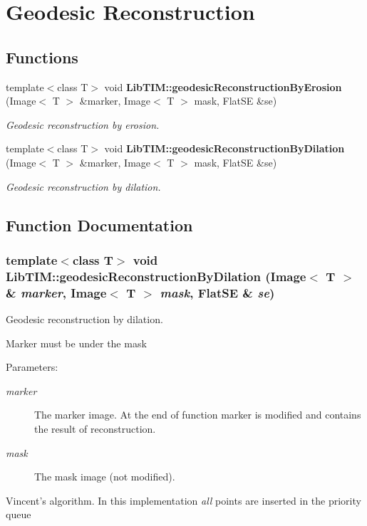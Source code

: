 \section{Geodesic Reconstruction}
\label{group__reconstruction}
\subsection*{Functions}
\begin{CompactItemize}
\item 
template$<$class T$>$ void {\bf Lib\-TIM::geodesic\-Reconstruction\-By\-Erosion} (Image$<$ T $>$ \&marker, Image$<$ T $>$ mask, Flat\-SE \&se)
\begin{CompactList}\small\item\em Geodesic reconstruction by erosion. \item\end{CompactList}\item 
template$<$class T$>$ void {\bf Lib\-TIM::geodesic\-Reconstruction\-By\-Dilation} (Image$<$ T $>$ \&marker, Image$<$ T $>$ mask, Flat\-SE \&se)
\begin{CompactList}\small\item\em Geodesic reconstruction by dilation. \item\end{CompactList}\end{CompactItemize}


\subsection{Function Documentation}
\subsubsection{\setlength{\rightskip}{0pt plus 5cm}template$<$class T$>$ void Lib\-TIM::geodesic\-Reconstruction\-By\-Dilation (Image$<$ T $>$ \& {\em marker}, Image$<$ T $>$ {\em mask}, Flat\-SE \& {\em se})}\label{group__reconstruction_ga1}


Geodesic reconstruction by dilation. 

Marker must be under the mask \begin{Desc}
\item[Parameters:]
\begin{description}
\item[{\em marker}]The marker image. At the end of function marker is modified and contains the result of reconstruction. \item[{\em mask}]The mask image (not modified).\end{description}
\end{Desc}
Vincent's algorithm. In this implementation {\em all\/} points are inserted in the priority queue
